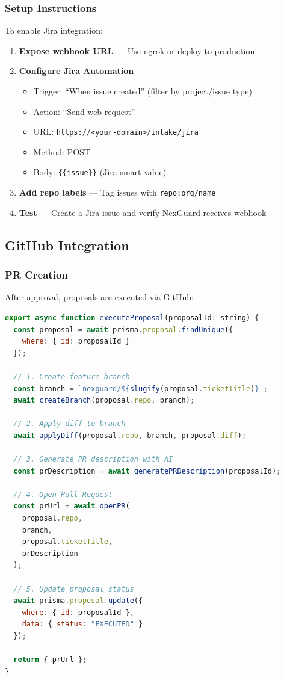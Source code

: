 \documentclass[11pt,a4paper]{article}
\begin{document}
\subsubsection{Setup Instructions}
To enable Jira integration:

\begin{enumerate}
    \item \textbf{Expose webhook URL} --- Use ngrok or deploy to production
    \item \textbf{Configure Jira Automation}
    \begin{itemize}
        \item Trigger: ``When issue created'' (filter by project/issue type)
        \item Action: ``Send web request''
        \item URL: \texttt{https://<your-domain>/intake/jira}
        \item Method: POST
        \item Body: \texttt{\{\{issue\}\}} (Jira smart value)
    \end{itemize}
    \item \textbf{Add repo labels} --- Tag issues with \texttt{repo:org/name}
    \item \textbf{Test} --- Create a Jira issue and verify NexGuard receives webhook
\end{enumerate}

\subsection{GitHub Integration}

\subsubsection{PR Creation}
After approval, proposals are executed via GitHub:

\begin{lstlisting}[language=JavaScript,caption=Executor Service (executor.ts)]
export async function executeProposal(proposalId: string) {
  const proposal = await prisma.proposal.findUnique({
    where: { id: proposalId }
  });
  
  // 1. Create feature branch
  const branch = `nexguard/${slugify(proposal.ticketTitle)}`;
  await createBranch(proposal.repo, branch);
  
  // 2. Apply diff to branch
  await applyDiff(proposal.repo, branch, proposal.diff);
  
  // 3. Generate PR description with AI
  const prDescription = await generatePRDescription(proposalId);
  
  // 4. Open Pull Request
  const prUrl = await openPR(
    proposal.repo, 
    branch, 
    proposal.ticketTitle,
    prDescription
  );
  
  // 5. Update proposal status
  await prisma.proposal.update({
    where: { id: proposalId },
    data: { status: "EXECUTED" }
  });
  
  return { prUrl };
}
\end{lstlisting}
\end{document}
